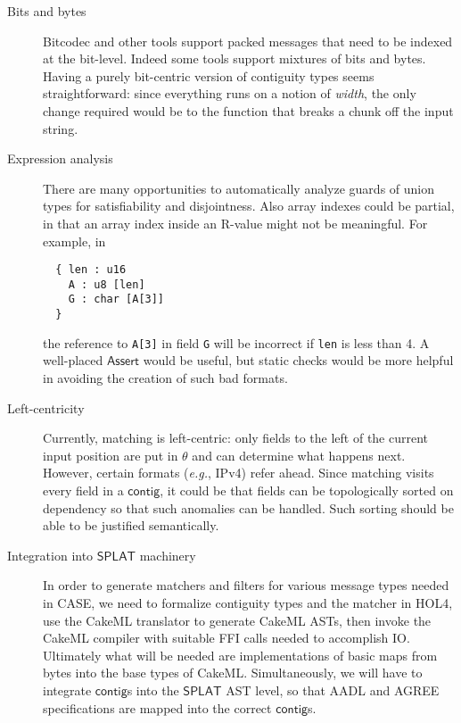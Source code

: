 \documentclass[sigplan,10pt,anonymous,review]{acmart}\settopmatter{printfolios=true,printccs=false,printacmref=false}
\newcommand{\eg}{\textit{e.g.}}
\newcommand{\konst}[1]{\ensuremath{\mathsf{#1}}}
\begin{document}
\begin{description}

\item [Bits and bytes] Bitcodec \cite{} and other tools support packed
  messages that need to be indexed at the bit-level. Indeed some tools
  support mixtures of bits and bytes. Having a purely bit-centric
  version of contiguity types seems straightforward: since everything
  runs on a notion of \emph{width}, the only change required would be
  to the function that breaks a chunk off the input string.

\item [Expression analysis] There are many opportunities to
  automatically analyze guards of union types for satisfiability and
  disjointness. Also array indexes could be partial, in that an array
  index inside an R-value might not be meaningful. For example, in

\begin{verbatim}
  { len : u16
    A : u8 [len]
    G : char [A[3]]
  }
\end{verbatim}

the reference to \verb+A[3]+ in field \verb+G+ will be incorrect if
\verb+len+ is less than 4. A well-placed \konst{Assert} would be
useful, but static checks would be more helpful in avoiding the
creation of such bad formats.

\item [Left-centricity] Currently, matching is left-centric: only
  fields to the left of the current input position are put in $\theta$
  and can determine what happens next. However, certain formats (\eg,
  IPv4) refer ahead. Since matching visits every field in a \konst{contig}, it
  could be that fields can be topologically sorted on dependency so
  that such anomalies can be handled. Such sorting should be able to
  be justified semantically.

\item [Integration into \konst{SPLAT} machinery] In order to generate
  matchers and filters for various message types needed in CASE, we
  need to formalize contiguity types and the matcher in HOL4, use the
  CakeML translator to generate CakeML ASTs, then invoke the CakeML
  compiler with suitable FFI calls needed to accomplish IO. Ultimately
  what will be needed are implementations of basic maps from bytes
  into the base types of CakeML. Simultaneously, we will have to
  integrate \konst{contig}s into the \konst{SPLAT} AST level, so that AADL and
  AGREE specifications are mapped into the correct \konst{contig}s.

\end{description}
\end{document}
